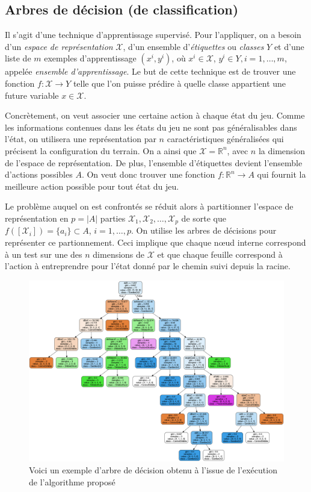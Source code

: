 \documentclass[12pt,a4paper]{article}
\begin{document}
\subsection*{Arbres de d\'ecision (de classification)}
Il s'agit d'une technique d'apprentissage supervis\'e. Pour l'appliquer, on 
a besoin d'un {\itshape espace de repr\'esentation} $\mathcal{X}$, d'un 
ensemble d'{\itshape \'etiquettes} ou {\itshape classes} $Y$ et d'une liste de 
$m$ exemples d'apprentissage $(x^i,y^i)$, o\`u $x^i \in \mathcal{X}$, $y^i \in 
Y, i = 1,\dotsc,m$, appel\'ee {\itshape ensemble d'apprentissage}.
Le but de cette technique est de trouver une fonction $f: \mathcal{X} \to 
Y$ telle que l'on puisse pr\'edire \`a quelle classe appartient une 
future variable $x \in \mathcal{X}$.

Concr\`etement, on veut associer une certaine action \`a chaque \'etat du jeu. 
Comme les informations contenues dans les \'etats du jeu ne sont pas 
g\'en\'eralisables dans l'\'etat, on utilisera une repr\'esentation par $n$ 
caract\'eristiques g\'en\'eralis\'ees qui pr\'ecisent la configuration du 
terrain. On a ainsi que $\mathcal{X} = \mathbb{R}^n$, avec $n$ la dimension de 
l'espace de repr\'esentation. De plus, l'ensemble d'\'etiquettes devient 
l'ensemble d'actions possibles $A$. On veut donc trouver une fonction $f: 
\mathbb{R}^n \to A$ qui fournit la meilleure action possible pour tout \'etat du 
jeu.

Le probl\`eme auquel on est confront\'es se r\'eduit alors \`a 
partitionner l'espace de repr\'esentation en $p=|A|$ parties 
$\mathcal{X}_1,\mathcal{X}_2,\dotsc,\mathcal{X}_p$ de sorte que 
$f([\mathcal{X}_i]) = \{ a_i \} \subset A$, $i = 1,\dotsc,p$. On utilise les 
arbres de d\'ecisions pour repr\'esenter ce partionnement. Ceci 
implique que chaque n\oe ud interne correspond \`a un test sur une des $n$ 
dimensions de $\mathcal{X}$ et que chaque feuille correspond \`a l'action \`a 
entreprendre pour l'\'etat donn\'e par le chemin suivi depuis la racine.

\begin{figure}[!h]
  \centering
  \captionsetup{justification=centering}
  \includegraphics[width=1.\textwidth]{dt_example}
  \caption[Un exemple d'arbre de d\'ecision]{Voici un exemple d'arbre de 
d\'ecision obtenu \`a l'issue de l'ex\'ecution de l'algorithme propos\'e}
  \label{fig:dt_ex}
\end{figure}
\end{document}
